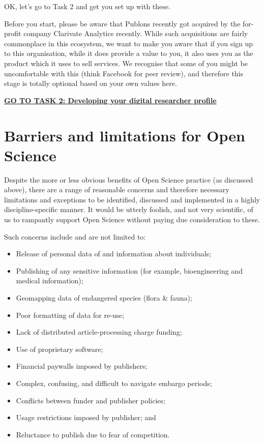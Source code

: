 \documentclass[]{book}
\begin{document}
{{{{OK, let's go to Task 2 and get you set up with these.

Before you start, please be aware that Publons recently got acquired by the for-profit company Clarivate Analytics recently. While such acquisitions are fairly commonplace in this ecosystem, we want to make you aware that if you sign up to this organisation, while it does provide a value to you, it also uses you as the product which it uses to sell services. We recognise that some of you might be uncomfortable with this (think Facebook for peer review), and therefore this stage is totally optional based on your own values here.

\href{Task_2.md}{\textbf{GO TO TASK 2: Developing your digital researcher profile}}

\hypertarget{barriers-and-limitations-for-open-science}{%
\section{Barriers and limitations for Open Science }\label{barriers-and-limitations-for-open-science}}

Despite the more or less obvious benefits of Open Science practice (as discussed above), there are a range of reasonable concerns and therefore necessary limitations and exceptions to be identified, discussed and implemented in a highly discipline-specific manner. It would be utterly foolish, and not very scientific, of us to rampantly support Open Science without paying due consideration to these.

Such concerns include and are not limited to:

\begin{itemize}
\item
  Release of personal data of and information about individuals;
\item
  Publishing of any sensitive information (for example, bioengineering and medical information);
\item
  Geomapping data of endangered species (flora \& fauna);
\item
  Poor formatting of data for re-use;
\item
  Lack of distributed article-processing charge funding;
\item
  Use of proprietary software;
\item
  Financial paywalls imposed by publishers;
\item
  Complex, confusing, and difficult to navigate embargo periods;
\item
  Conflicts between funder and publisher policies;
\item
  Usage restrictions imposed by publisher; and
\item
  Reluctance to publish due to fear of competition.
\end{itemize}

}}}}
\end{document}
